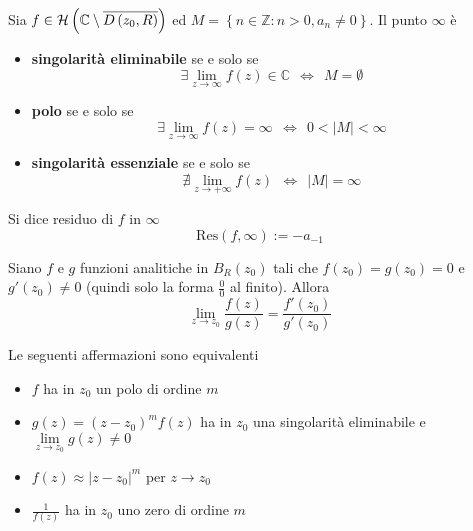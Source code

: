 \begin{thm}
Sia $f\in \mathcal{H} \left(\mathbb{C} \setminus \overline{D\left( z_{0} ,R\right)}\right)$ ed $M=\left\{n\in \mathbb{Z} :n >0,a_{n} \neq 0\right\}$. Il punto $\infty $ è

\begin{itemize}
\item \textbf{singolarità eliminabile} se e solo se\begin{equation*}
\exists \lim\limits _{z\rightarrow \infty } f\left( z\right) \in \mathbb{C} \ \ \iff \ \ M=\emptyset 
\end{equation*}
\item \textbf{polo} se e solo se\begin{equation*}
\exists \lim\limits _{z\rightarrow \infty } f\left( z\right) =\infty \ \ \iff \ \ 0< \left| M\right| < \infty 
\end{equation*}
\item \textbf{singolarità essenziale} se e solo se\begin{equation*}
\nexists \lim\limits _{z\rightarrow +\infty } f\left( z\right) \ \ \iff \ \ \left| M\right| =\infty 
\end{equation*}
\end{itemize}
\end{thm}
\begin{defn}
Si dice residuo di $f$ in $\infty $
\begin{equation*}
\mathrm{Res}\left( f,\infty \right) :=-a_{-1}
\end{equation*}
\end{defn}
\begin{thm}
[di De l'Hôpital] Siano $f$ e $g$ funzioni analitiche in $B_{R}\left( z_{0}\right)$ tali che $f\left( z_{0}\right) =g\left( z_{0}\right) =0$ e $g'\left( z_{0}\right) \neq 0$ (quindi solo la forma $\frac{0}{0}$ al finito). Allora
\begin{equation*}
\lim\limits _{z\rightarrow z_{0}}\frac{f\left( z\right)}{g\left( z\right)} =\frac{f'\left( z_{0}\right)}{g'\left( z_{0}\right)}
\end{equation*}
\end{thm}
\begin{thm}
Le seguenti affermazioni sono equivalenti
\begin{itemize}
\item $f$ ha in $z_{0}$ un polo di ordine $m$
\item $g\left( z\right) =\left( z-z_{0}\right)^{m} f\left( z\right)$ ha in $z_{0}$ una singolarità eliminabile e $\lim\limits _{z\rightarrow z_{0}} g\left( z\right) \neq 0$
\item $f\left( z\right) \approx \left| z-z_{0}\right| ^{m}$ per $z\rightarrow z_{0}$
\item $\frac{1}{f\left( z\right)}$ ha in $z_{0}$ uno zero di ordine $m$
\end{itemize}
\end{thm}

